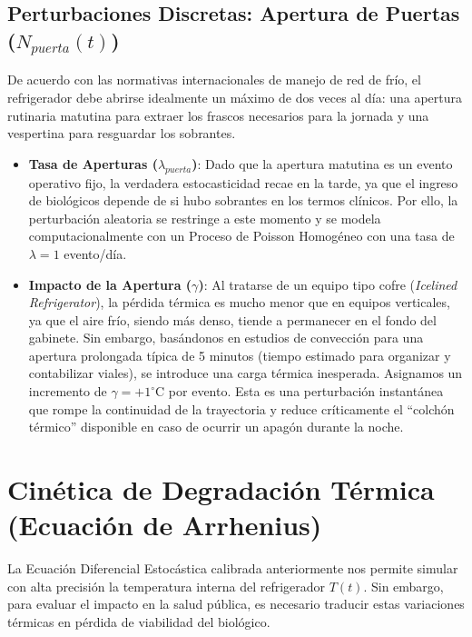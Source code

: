 \documentclass[
  spanish,
  letterpaper,
  DIV=11,
  numbers=noendperiod]{scrreprt}
\providecommand{\tightlist}{%
  \setlength{\itemsep}{0pt}\setlength{\parskip}{0pt}}
\theoremstyle{plain}
\theoremstyle{definition}
\theoremstyle{remark}
\begin{document}
\subsection{\texorpdfstring{Perturbaciones Discretas: Apertura de
Puertas
(\(N_{puerta}(t)\))}{Perturbaciones Discretas: Apertura de Puertas (N\_\{puerta\}(t))}}\label{perturbaciones-discretas-apertura-de-puertas-n_puertat}

De acuerdo con las normativas internacionales de manejo de red de frío,
el refrigerador debe abrirse idealmente un máximo de dos veces al día:
una apertura rutinaria matutina para extraer los frascos necesarios para
la jornada y una vespertina para resguardar los sobrantes.

\begin{itemize}
\tightlist
\item
  \textbf{Tasa de Aperturas (\(\lambda_{puerta}\))}: Dado que la
  apertura matutina es un evento operativo fijo, la verdadera
  estocasticidad recae en la tarde, ya que el ingreso de biológicos
  depende de si hubo sobrantes en los termos clínicos. Por ello, la
  perturbación aleatoria se restringe a este momento y se modela
  computacionalmente con un Proceso de Poisson Homogéneo con una tasa de
  \(\lambda = 1\) evento/día.
\item
  \textbf{Impacto de la Apertura (\(\gamma\))}: Al tratarse de un equipo
  tipo cofre (\emph{Icelined Refrigerator}), la pérdida térmica es mucho
  menor que en equipos verticales, ya que el aire frío, siendo más
  denso, tiende a permanecer en el fondo del gabinete. Sin embargo,
  basándonos en estudios de convección para una apertura prolongada
  típica de 5 minutos (tiempo estimado para organizar y contabilizar
  viales), se introduce una carga térmica inesperada. Asignamos un
  incremento de \textbf{\(\gamma = +1^\circ \text{C}\)} por evento. Esta
  es una perturbación instantánea que rompe la continuidad de la
  trayectoria y reduce críticamente el ``colchón térmico'' disponible en
  caso de ocurrir un apagón durante la noche.
\end{itemize}

\section{Cinética de Degradación Térmica (Ecuación de
Arrhenius)}\label{sec-Arrhenius}

La Ecuación Diferencial Estocástica calibrada anteriormente nos permite
simular con alta precisión la temperatura interna del refrigerador
\(T(t)\). Sin embargo, para evaluar el impacto en la salud pública, es
necesario traducir estas variaciones térmicas en pérdida de viabilidad
del biológico.
\end{document}
